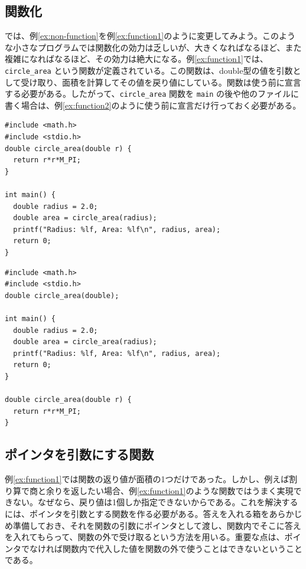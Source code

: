 \subsection{関数化}
では、例\ref{ex:non-function}を例\ref{ex:function1}のように変更してみよう。このような小さなプログラムでは関数化の効力は乏しいが、大きくなればなるほど、また複雑になればなるほど、その効力は絶大になる。例\ref{ex:function1}では、\verb|circle_area| という関数が定義されている。この関数は、double型の値を引数として受け取り、面積を計算してその値を戻り値にしている。関数は使う前に宣言する必要がある。したがって、\verb|circle_area| 関数を \verb|main| の後や他のファイルに書く場合は、例\ref{ex:function2}のように使う前に宣言だけ行っておく必要がある。
\begin{reidai}\label{ex:function1}
\begin{verbatim}
#include <math.h>
#include <stdio.h>
double circle_area(double r) {
  return r*r*M_PI;
}

int main() {
  double radius = 2.0;
  double area = circle_area(radius);
  printf("Radius: %lf, Area: %lf\n", radius, area);
  return 0;
}
\end{verbatim}
\end{reidai}
\begin{reidai}\label{ex:function2}
\begin{verbatim}
#include <math.h>
#include <stdio.h>
double circle_area(double);

int main() {
  double radius = 2.0;
  double area = circle_area(radius);
  printf("Radius: %lf, Area: %lf\n", radius, area);
  return 0;
} 

double circle_area(double r) {
  return r*r*M_PI;
}
\end{verbatim}
\end{reidai}

\subsection{ポインタを引数にする関数}

例\ref{ex:function1}では関数の返り値が面積の1つだけであった。しかし、例えば割り算で商と余りを返したい場合、例\ref{ex:function1}のような関数ではうまく実現できない。なぜなら、戻り値は1個しか指定できないからである。これを解決するには、ポインタを引数とする関数を作る必要がある。答えを入れる箱をあらかじめ準備しておき、それを関数の引数にポインタとして渡し、関数内でそこに答えを入れてもらって、関数の外で受け取るという方法を用いる。重要な点は、ポインタでなければ関数内で代入した値を関数の外で使うことはできないということである。


